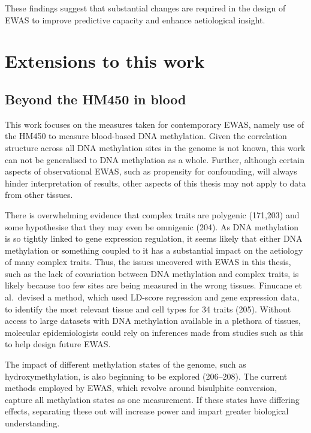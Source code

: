 \documentclass[11pt,oneside]{bristolthesis}
\begin{document}
These findings suggest that substantial changes are required in the design of EWAS to improve predictive capacity and enhance aetiological insight.

\hypertarget{extensions-to-work}{%
\section{Extensions to this work}\label{extensions-to-work}}

\hypertarget{beyond-the-hm450}{%
\subsection{Beyond the HM450 in blood}\label{beyond-the-hm450}}

This work focuses on the measures taken for contemporary EWAS, namely use of the HM450 to measure blood-based DNA methylation. Given the correlation structure across all DNA methylation sites in the genome is not known, this work can not be generalised to DNA methylation as a whole. Further, although certain aspects of observational EWAS, such as propensity for confounding, will always hinder interpretation of results, other aspects of this thesis may not apply to data from other tissues.

There is overwhelming evidence that complex traits are polygenic (171,203) and some hypothesise that they may even be omnigenic (204). As DNA methylation is so tightly linked to gene expression regulation, it seems likely that either DNA methylation or something coupled to it has a substantial impact on the aetiology of many complex traits. Thus, the issues uncovered with EWAS in this thesis, such as the lack of covariation between DNA methylation and complex traits, is likely because too few sites are being measured in the wrong tissues. Finucane et al.~devised a method, which used LD-score regression and gene expression data, to identify the most relevant tissue and cell types for 34 traits (205). Without access to large datasets with DNA methylation available in a plethora of tissues, molecular epidemiologists could rely on inferences made from studies such as this to help design future EWAS.

The impact of different methylation states of the genome, such as hydroxymethylation, is also beginning to be explored (206--208). The current methods employed by EWAS, which revolve around bisulphite conversion, capture all methylation states as one measurement. If these states have differing effects, separating these out will increase power and impart greater biological understanding.
\end{document}

